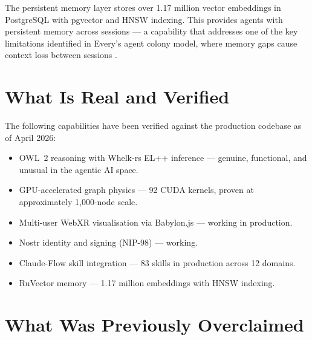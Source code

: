The persistent memory layer stores over 1.17 million vector embeddings in PostgreSQL with pgvector and HNSW indexing. This provides agents with persistent memory across sessions --- a capability that addresses one of the key limitations identified in Every's agent colony model, where memory gaps cause context loss between sessions \parencite{Shipper2026}.

\section{What Is Real and Verified}

The following capabilities have been verified against the production codebase as of April 2026:

\begin{itemize}
  \item OWL~2 reasoning with Whelk-rs EL++ inference --- genuine, functional, and unusual in the agentic AI space.
  \item GPU-accelerated graph physics --- 92 CUDA kernels, proven at approximately 1,000-node scale.
  \item Multi-user WebXR visualisation via Babylon.js --- working in production.
  \item Nostr identity and signing (NIP-98) --- working.
  \item Claude-Flow skill integration --- 83 skills in production across 12 domains.
  \item RuVector memory --- 1.17 million embeddings with HNSW indexing.
\end{itemize}

\section{What Was Previously Overclaimed}

